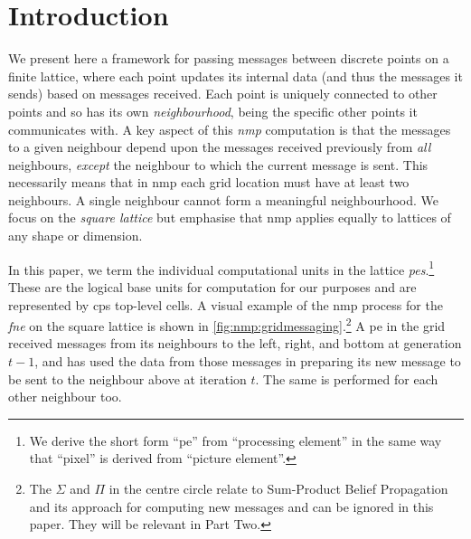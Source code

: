 \section{Introduction}
We present here a framework for passing messages between discrete points on a finite lattice, where each point updates its internal data (and thus the messages it sends) based on messages received.  Each point is uniquely connected to other points and so has its own \emph{neighbourhood}, being the specific other points it communicates with.  A key aspect of this \emph{\gls{nmp}} computation is that the messages to a given neighbour depend upon the messages received previously from \emph{all} neighbours, \emph{except} the neighbour to which the current message is sent.    This necessarily means that in \gls{nmp} each grid location must have at least two neighbours.  A single neighbour cannot form a meaningful neighbourhood.  We focus on the \emph{square lattice} but emphasise that \gls{nmp} applies equally to lattices of any shape or dimension.

In this paper, we term the individual computational units in the lattice \emph{\glspl{pe}}.\footnote{We derive the short form ``\gls{pe}'' from ``processing element'' in the same way that ``pixel'' is derived from ``picture element''.}  These are the logical base units for computation for our purposes and are represented by \gls{cps} top-level cells.  A visual example of the \gls{nmp} process for the \emph{\gls{fne}} on the square lattice is shown in \cref{fig:nmp:gridmessaging}.\footnote{The \(\Sigma\) and \(\Pi\) in the centre circle relate to Sum-Product Belief Propagation and its approach for computing new messages and can be ignored in this paper.  They will be relevant in Part Two.}  A \gls{pe} in the grid received messages from its neighbours to the left, right, and bottom at generation \(t - 1\), and has used the data from those messages in preparing its new message to be sent to the neighbour above at iteration \(t\).  The same is performed for each other neighbour too.

